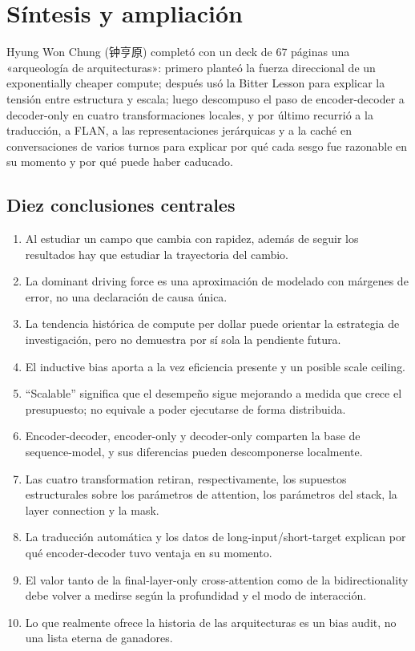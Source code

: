 \documentclass[a4paper]{article}
\begin{document}
\section{Síntesis y ampliación}

Hyung Won Chung (钟亨原) completó con un deck de 67 páginas una «arqueología de arquitecturas»: primero planteó la fuerza direccional de un exponentially cheaper compute; después usó la Bitter Lesson para explicar la tensión entre estructura y escala; luego descompuso el paso de encoder-decoder a decoder-only en cuatro transformaciones locales, y por último recurrió a la traducción, a FLAN, a las representaciones jerárquicas y a la caché en conversaciones de varios turnos para explicar por qué cada sesgo fue razonable en su momento y por qué puede haber caducado.

\subsection{Diez conclusiones centrales}

\begin{enumerate}
  \item Al estudiar un campo que cambia con rapidez, además de seguir los resultados hay que estudiar la trayectoria del cambio.
  \item La dominant driving force es una aproximación de modelado con márgenes de error, no una declaración de causa única.
  \item La tendencia histórica de compute per dollar puede orientar la estrategia de investigación, pero no demuestra por sí sola la pendiente futura.
  \item El inductive bias aporta a la vez eficiencia presente y un posible scale ceiling.
  \item ``Scalable'' significa que el desempeño sigue mejorando a medida que crece el presupuesto; no equivale a poder ejecutarse de forma distribuida.
  \item Encoder-decoder, encoder-only y decoder-only comparten la base de sequence-model, y sus diferencias pueden descomponerse localmente.
  \item Las cuatro transformation retiran, respectivamente, los supuestos estructurales sobre los parámetros de attention, los parámetros del stack, la layer connection y la mask.
  \item La traducción automática y los datos de long-input/short-target explican por qué encoder-decoder tuvo ventaja en su momento.
  \item El valor tanto de la final-layer-only cross-attention como de la bidirectionality debe volver a medirse según la profundidad y el modo de interacción.
  \item Lo que realmente ofrece la historia de las arquitecturas es un bias audit, no una lista eterna de ganadores.
\end{enumerate}
\end{document}
